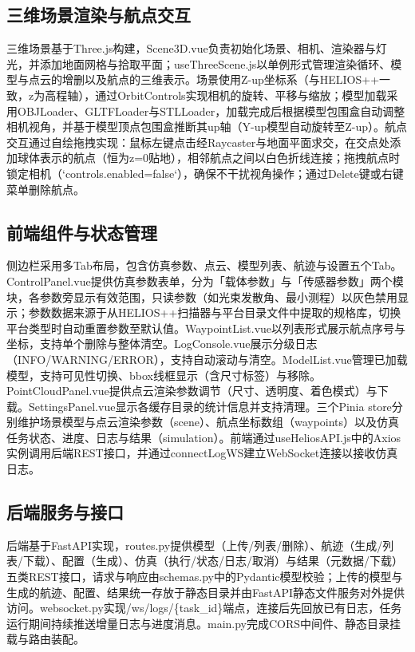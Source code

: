 \documentclass[a4paper,fleqn]{cas-sc}
\begin{document}
\subsection{三维场景渲染与航点交互}
三维场景基于Three.js构建，Scene3D.vue负责初始化场景、相机、渲染器与灯光，并添加地面网格与拾取平面；useThreeScene.js以单例形式管理渲染循环、模型与点云的增删以及航点的三维表示。场景使用Z-up坐标系（与HELIOS++一致，z为高程轴），通过OrbitControls实现相机的旋转、平移与缩放；模型加载采用OBJLoader、GLTFLoader与STLLoader，加载完成后根据模型包围盒自动调整相机视角，并基于模型顶点包围盒推断其up轴（Y-up模型自动旋转至Z-up）。航点交互通过自绘拖拽实现：鼠标左键点击经Raycaster与地面平面求交，在交点处添加球体表示的航点（恒为z=0贴地），相邻航点之间以白色折线连接；拖拽航点时锁定相机（`controls.enabled=false`），确保不干扰视角操作；通过Delete键或右键菜单删除航点。

\subsection{前端组件与状态管理}
侧边栏采用多Tab布局，包含仿真参数、点云、模型列表、航迹与设置五个Tab。ControlPanel.vue提供仿真参数表单，分为「载体参数」与「传感器参数」两个模块，各参数旁显示有效范围，只读参数（如光束发散角、最小测程）以灰色禁用显示；参数数据来源于从HELIOS++扫描器与平台目录文件中提取的规格库，切换平台类型时自动重置参数至默认值。WaypointList.vue以列表形式展示航点序号与坐标，支持单个删除与整体清空。LogConsole.vue展示分级日志（INFO/WARNING/ERROR），支持自动滚动与清空。ModelList.vue管理已加载模型，支持可见性切换、bbox线框显示（含尺寸标签）与移除。PointCloudPanel.vue提供点云渲染参数调节（尺寸、透明度、着色模式）与下载。SettingsPanel.vue显示各缓存目录的统计信息并支持清理。三个Pinia store分别维护场景模型与点云渲染参数（scene）、航点坐标数组（waypoints）以及仿真任务状态、进度、日志与结果（simulation）。前端通过useHeliosAPI.js中的Axios实例调用后端REST接口，并通过connectLogWS建立WebSocket连接以接收仿真日志。

\subsection{后端服务与接口}
后端基于FastAPI实现，routes.py提供模型（上传/列表/删除）、航迹（生成/列表/下载）、配置（生成）、仿真（执行/状态/日志/取消）与结果（元数据/下载）五类REST接口，请求与响应由schemas.py中的Pydantic模型校验；上传的模型与生成的航迹、配置、结果统一存放于静态目录并由FastAPI静态文件服务对外提供访问。websocket.py实现/ws/logs/\{task\_id\}端点，连接后先回放已有日志，任务运行期间持续推送增量日志与进度消息。main.py完成CORS中间件、静态目录挂载与路由装配。
\end{document}

